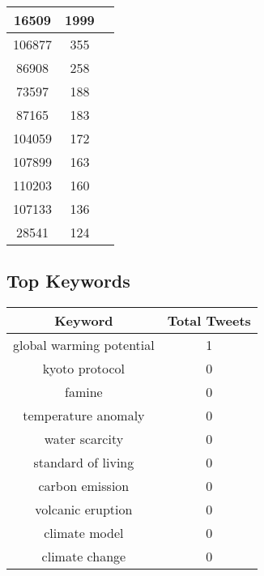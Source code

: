 \documentclass{article}\usepackage[T1]{fontenc}
\begin{document}
\begin{tabular}{|c|c|c|}
 \hline
16509 & 1999\\ 
 \hline
106877 & 355\\ 
 \hline
86908 & 258\\ 
 \hline
73597 & 188\\ 
 \hline
87165 & 183\\ 
 \hline
104059 & 172\\ 
 \hline
107899 & 163\\ 
 \hline
110203 & 160\\ 
 \hline
107133 & 136\\ 
 \hline
28541 & 124\\ 
 \hline
\end{tabular}\subsection*{Top Keywords}\begin{tabular}{|c|c|}         \hline         Keyword & Total Tweets \\ 
 \hline
global warming potential & 1\\ 
 \hline
kyoto protocol & 0\\ 
 \hline
famine & 0\\ 
 \hline
temperature anomaly & 0\\ 
 \hline
water scarcity & 0\\ 
 \hline
standard of living & 0\\ 
 \hline
carbon emission & 0\\ 
 \hline
volcanic eruption & 0\\ 
 \hline
climate model & 0\\ 
 \hline
climate change & 0\\ 
 \hline
\end{tabular}
\end{document}

